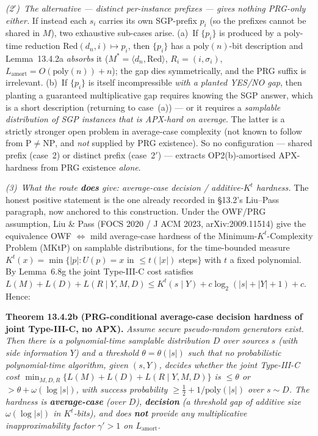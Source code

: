 \documentclass[
]{article}
\begin{document}
\emph{(2$'$)~The alternative --- distinct per-instance prefixes ---
gives nothing PRG-only either.} If instead each $s_i$ carries its own
SGP-prefix $p_i$ (so the prefixes cannot be shared in $M$), two
exhaustive sub-cases arise. (a)~If $\{p_i\}$ is produced by a poly-time
reduction $\mathrm{Red}(d_n,i)\mapsto p_i$, then $\{p_i\}$ has a
$\mathrm{poly}(n)$-bit description and Lemma~13.4.2a \emph{absorbs} it
($M^*=\langle d_n,\mathrm{Red}\rangle$, $R_i=(i,\sigma_i)$,
$L_{\mathrm{amort}}=O(\mathrm{poly}(n))+n$); the gap dies symmetrically,
and the PRG suffix is irrelevant. (b)~If $\{p_i\}$ is itself
incompressible \emph{with a planted YES/NO gap}, then planting a
guaranteed multiplicative gap requires knowing the SGP answer, which is
a short description (returning to case~(a)) --- or it requires a
\emph{samplable distribution of SGP instances that is APX-hard on
average}. The latter is a strictly stronger open problem in average-case
complexity (not known to follow from $\mathrm{P}\neq\mathrm{NP}$, and
\emph{not} supplied by PRG existence). So no configuration --- shared
prefix (case~2) or distinct prefix (case~2$'$) --- extracts
OP2(b)-amortised APX-hardness from PRG existence \emph{alone}.

\emph{(3)~What the route \textbf{does} give: average-case decision /
additive-$K^t$ hardness.} The honest positive statement is the one
already recorded in §13.2's Liu--Pass paragraph, now anchored to this
construction. Under the OWF/PRG assumption, Liu \& Pass (FOCS 2020 / J
ACM 2023, arXiv:2009.11514) give the equivalence OWF $\Leftrightarrow$
mild average-case hardness of the Minimum-$K^t$-Complexity Problem
(MKtP) on samplable distributions, for the time-bounded measure
$K^t(x)=\min\{|p|:U(p)=x$ in $\le t(|x|)$ steps$\}$ with $t$ a fixed
polynomial. By Lemma~6.8g the joint Type-III-C cost satisfies
$L(M)+L(D)+L(R\mid Y,M,D)\le K^t(s\mid Y)+c\log_2(|s|+|Y|+1)+c$.
Hence:

\textbf{Theorem 13.4.2b (PRG-conditional average-case decision hardness
of joint Type-III-C, no APX).} \emph{Assume secure pseudo-random
generators exist. Then there is a polynomial-time samplable
distribution $D$ over sources $s$ (with side information $Y$) and a
threshold $\theta=\theta(|s|)$ such that no probabilistic
polynomial-time algorithm, given $(s,Y)$, decides whether the joint
Type-III-C cost $\min_{M,D,R}\{L(M)+L(D)+L(R\mid Y,M,D)\}$ is
$\le\theta$ or $>\theta+\omega(\log|s|)$, with success probability
$\ge\tfrac12+1/\mathrm{poly}(|s|)$ over $s\sim D$. The hardness is
\textbf{average-case} (over $D$), \textbf{decision} (a threshold gap of
additive size $\omega(\log|s|)$ in $K^t$-bits), and does \textbf{not}
provide any multiplicative inapproximability factor $\gamma'>1$ on
$L_{\mathrm{amort}}$.}
\end{document}
